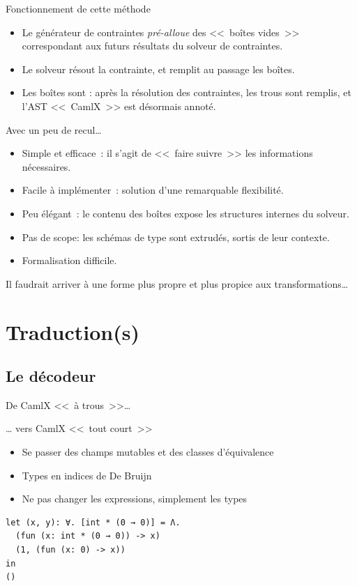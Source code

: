 \documentclass[final]{beamer}
\begin{document}
\begin{frame}{Fonctionnement de cette méthode}
  \begin{itemize}
    \item Le générateur de contraintes \emph{pré-alloue} des <<~boîtes vides~>>
      correspondant aux futurs résultats du solveur de contraintes.
    \item Le solveur résout la contrainte, et remplit au passage les boîtes.
    \item Les boîtes sont \underline{}: après la résolution des
      contraintes, les trous sont remplis, et l'AST <<~CamlX~>> est désormais annoté.
  \end{itemize}
\end{frame}

\begin{frame}{Avec un peu de recul…}
  \begin{itemize}
    \item Simple et efficace~: il s'agit de <<~faire suivre~>> les informations
      nécessaires.
    \item Facile à implémenter~: solution d'une remarquable flexibilité.
    \item Peu élégant~: le contenu des boîtes expose les structures internes du
      solveur.
    \item Pas de scope: les schémas de type sont extrudés, sortis de leur
      contexte.
    \item Formalisation difficile.
  \end{itemize}
  Il faudrait arriver à une forme plus propre et plus propice aux
  transformations…
\end{frame}

\section{Traduction(s)}

\subsection{Le décodeur}

\begin{frame}[fragile]{De CamlX <<~à trous~>>…}

  … vers CamlX <<~tout court~>>

  \begin{itemize}
    \item Se passer des champs mutables et des classes d'équivalence
    \item Types en indices de De Bruijn
    \item Ne pas changer les expressions, simplement les types
  \end{itemize}

  \begin{verbatim}
let (x, y): ∀. [int * (0 → 0)] = Λ. 
  (fun (x: int * (0 → 0)) -> x)
  (1, (fun (x: 0) -> x))
in
()
  \end{verbatim}
\end{frame}
\end{document}
